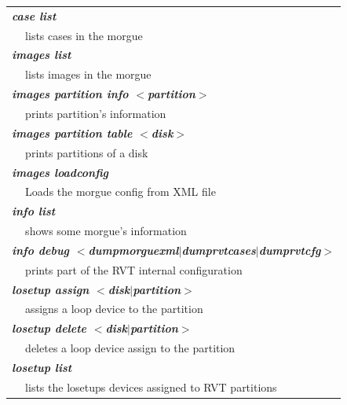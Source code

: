 \documentclass[a4paper,11pt,oneside]{report}
\begin{document}
\begin{table}[p]
\footnotesize


\begin{tabular}{| p{1cm}  p{10cm} | }

\hline 

\multicolumn{2}{|l|}{\it \bf
case list
} \\
 & lists cases in the morgue \\

\hline \hline

\multicolumn{2}{|l|}{\it \bf
images list
} \\
 & lists images in the morgue \\

\hline \hline

\multicolumn{2}{|l|}{\it \bf
images partition info $<$partition$>$
} \\
 & prints partition's information  \\

\multicolumn{2}{|l|}{\it \bf
images partition table $<$disk$>$
} \\
 &  prints partitions of a disk \\

\multicolumn{2}{|l|}{\it \bf
images loadconfig
} \\
 & Loads the morgue config from XML file \\

\hline \hline

\multicolumn{2}{|l|}{\it \bf
info list
} \\
 & shows some morgue's information \\

\multicolumn{2}{|l|}{\it \bf
info debug $<$dumpmorguexml$|$dumprvtcases$|$dumprvtcfg$>$
} \\
 & prints part of the RVT internal configuration  \\

\hline \hline


\multicolumn{2}{|l|}{\it \bf
losetup assign $<$disk$|$partition$>$
} \\
 & assigns a loop device to the partition \\

\multicolumn{2}{|l|}{\it \bf
losetup delete $<$disk$|$partition$>$
} \\
 & deletes a loop device assign to the partition \\

\multicolumn{2}{|l|}{\it \bf
losetup list 
} \\
 & lists the losetups devices assigned to RVT partitions \\


\end{tabular}
\end{table}
\end{document}
